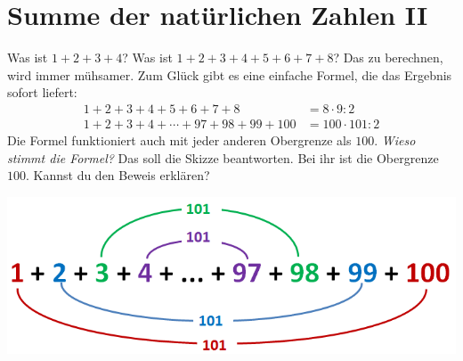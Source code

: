 \documentclass{../zirkelblatt}
\begin{document}
\section*{Summe der natürlichen Zahlen II}
Was ist $1 + 2 + 3 + 4$? Was ist $1 + 2 + 3 + 4 + 5 + 6 + 7 + 8$? Das zu
berechnen, wird immer mühsamer. Zum Glück gibt es eine einfache Formel, die das
Ergebnis sofort liefert:
\begin{align*}
  1 + 2 + 3 + 4 + 5 + 6 + 7 + 8 &= 8 \cdot 9 : 2 \\
  1 + 2 + 3 + 4 + \cdots + 97 + 98 + 99 + 100 &= 100 \cdot 101 : 2
\end{align*}
Die Formel funktioniert auch mit jeder anderen Obergrenze als $100$. \emph{Wieso
stimmt die Formel?} Das soll die Skizze beantworten. Bei ihr ist die
Obergrenze~$100$. Kannst du den Beweis erklären?
\begin{center}
\includegraphics[scale=0.7]{kleiner-gauss-2}
\end{center}


\vfill
\end{document}
